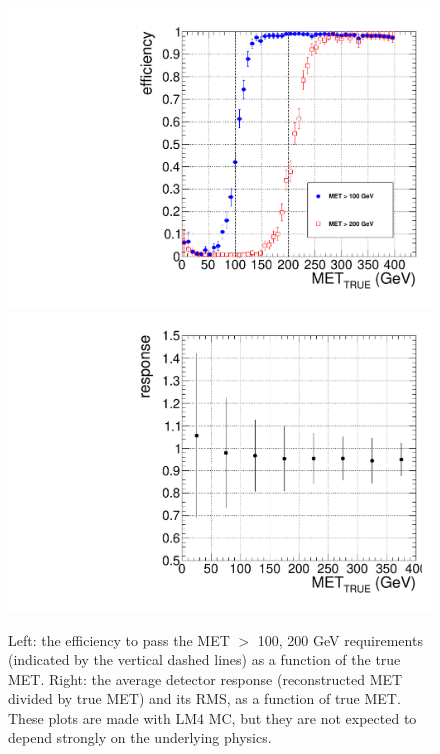 \begin{figure}[tbh]
  \begin{center}
	\includegraphics[width=0.45\linewidth]{plots/met_efficiency.pdf}
	\includegraphics[width=0.45\linewidth]{plots/met_response.pdf}
	\caption{\label{fig:LM4_met}\protect 
	  Left: the efficiency to pass the MET $>$ 100, 200 GeV requirements 
	  (indicated by the vertical dashed lines)
	  as a function of the true MET. Right: the average detector response
	  (reconstructed MET divided by true MET) 
	  and its RMS, as a function of true MET. These plots are made with LM4 MC, but they are 
	  not expected to depend
	  strongly on the underlying physics.}
  \end{center}
\end{figure}